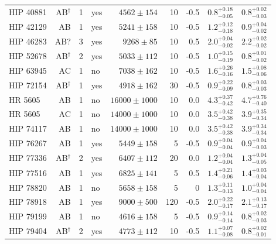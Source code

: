 \begin{scriptsize}
\begin{longtable}{|l|rrlrrrll|}
  HIP 40881 & AB$^{\dagger}$ &     1 & yes &  $4562 \pm 154$ &      10 &    -0.5  &  $0.8^{+0.18}_{-0.05}$ &  $0.8^{+0.02}_{-0.03}$ \\
  HIP 42129 & AB &     1 & yes &  $5241 \pm 158$ &      10 &    -0.5  &  $1.2^{+0.12}_{-0.18}$ &  $0.9^{+0.04}_{-0.02}$ \\
  HIP 46283 & AB? &     3 & yes &   $9268 \pm 85$ &      10 &     0.5  &    $2.0^{+0.04}_{-0.02}$ &  $2.2^{+0.02}_{-0.02}$ \\
  HIP 52678 & AB$^{\dagger}$ &     2 & yes &  $5033 \pm 112$ &      10 &    -0.5  &  $1.0^{+0.15}_{-0.19}$ &  $0.8^{+0.01}_{-0.02}$ \\  
  HIP 63945 & AC &     1 & no &  $7038 \pm 162$ &      10 &    -0.5 &  $1.6^{+0.26}_{-0.16}$ &  $1.5^{+0.08}_{-0.06}$ \\
  HIP 72154 & AB$^{\dagger}$ &     1 & yes &  $4918 \pm 162$ &      30 &    -0.5  &  $0.9^{+0.22}_{-0.09}$ &  $0.8^{+0.03}_{-0.03}$ \\
    HR 5605 & AB &     1 & no &  $16000 \pm 1000$ &     10 &     0.0 &  $4.3^{+0.37}_{-0.42}$ &  $4.7^{+0.76}_{-0.40}$ \\
    HR 5605 & AC &     1 & no &  $14000 \pm 1000$ &     10 &     0.0 &  $3.5^{+0.42}_{-0.38}$ &  $3.9^{+0.35}_{-0.34}$ \\
  HIP 74117 & AB &     1 & no &  $14000 \pm 1000$ &     10 &     0.0 &  $3.5^{+0.42}_{-0.38}$ &  $3.9^{+0.34}_{-0.34}$ \\
  HIP 76267 & AB &     1 & yes &  $5449 \pm 158$ &       5 &    -0.5  &  $0.9^{+0.04}_{-0.04}$ &  $0.9^{+0.04}_{-0.03}$ \\
  HIP 77336 & AB$^{\dagger}$ &     2 & yes &  $6407 \pm 112$ &      20 &     0.0  &  $1.2^{+0.04}_{-0.04}$ &  $1.3^{+0.04}_{-0.05}$ \\
  HIP 77516 & AB &     1 & yes &  $6825 \pm 141$ &       5 &     0.5  &  $1.4^{+0.21}_{-0.06}$ &  $1.4^{+0.03}_{-0.04}$ \\
  HIP 78820 & AB &     1 & no &  $5658 \pm 158$ &       5 &    0 &  $1.3^{+0.11}_{-0.13}$ &  $1.0^{+0.04}_{-0.04}$ \\
  HIP 78918 & AB &     1 & yes &    $9000 \pm 500$ &    120 &    -0.5 &  $2.0^{+0.22}_{-0.17}$ &  $2.1^{+0.13}_{-0.17}$ \\
  HIP 79199 & AB &     1 & no &  $4616 \pm 158$ &       5 &    -0.5  &  $0.9^{+0.14}_{-0.14}$ &  $0.8^{+0.02}_{-0.03}$ \\
  HIP 79404 & AB$^{\dagger}$ &     2 & yes &  $4773 \pm 112$ &      10 &    -0.5  &  $1.1^{+0.07}_{-0.08}$ &  $0.8^{+0.02}_{-0.01}$ \\

\end{longtable}
\end{scriptsize}

